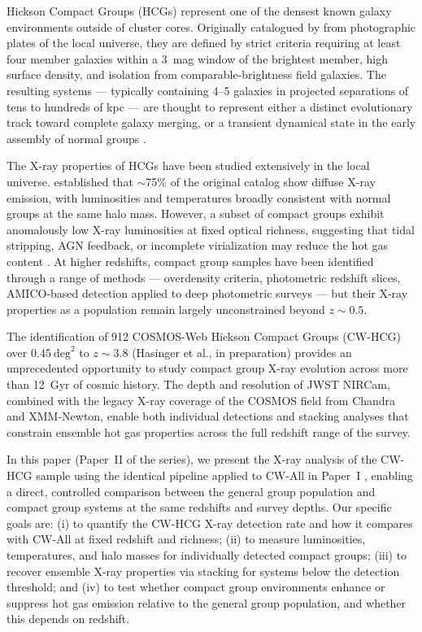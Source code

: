 \documentclass{aa}
\begin{document}
Hickson Compact Groups (HCGs) represent one of the densest known galaxy environments outside of cluster cores. Originally catalogued by \citet{Hickson1982} from photographic plates of the local universe, they are defined by strict criteria requiring at least four member galaxies within a 3~mag window of the brightest member, high surface density, and isolation from comparable-brightness field galaxies. The resulting systems --- typically containing 4--5 galaxies in projected separations of tens to hundreds of kpc --- are thought to represent either a distinct evolutionary track toward complete galaxy merging, or a transient dynamical state in the early assembly of normal groups \citep{MendesDeOliveira1994}.

The X-ray properties of HCGs have been studied extensively in the local universe. \citet{Ponman1996} established that $\sim$75\% of the original \citet{Hickson1982} catalog show diffuse X-ray emission, with luminosities and temperatures broadly consistent with normal groups at the same halo mass. However, a subset of compact groups exhibit anomalously low X-ray luminosities at fixed optical richness, suggesting that tidal stripping, AGN feedback, or incomplete virialization may reduce the hot gas content \citep{Mulchaey2000,Osmond2004}. At higher redshifts, compact group samples have been identified through a range of methods --- overdensity criteria, photometric redshift slices, AMICO-based detection applied to deep photometric surveys --- but their X-ray properties as a population remain largely unconstrained beyond $z \sim 0.5$.

The identification of 912 COSMOS-Web Hickson Compact Groups (CW-HCG) over $0.45~\mathrm{deg}^2$ to $z \sim 3.8$ (Hasinger et al., in preparation) provides an unprecedented opportunity to study compact group X-ray evolution across more than 12~Gyr of cosmic history. The depth and resolution of JWST NIRCam, combined with the legacy X-ray coverage of the COSMOS field from Chandra and XMM-Newton, enable both individual detections and stacking analyses that constrain ensemble hot gas properties across the full redshift range of the survey.

In this paper (Paper~II of the series), we present the X-ray analysis of the CW-HCG sample using the identical pipeline applied to CW-All in Paper~I \citep{Gozaliasl2026a}, enabling a direct, controlled comparison between the general group population and compact group systems at the same redshifts and survey depths. Our specific goals are: (i) to quantify the CW-HCG X-ray detection rate and how it compares with CW-All at fixed redshift and richness; (ii) to measure luminosities, temperatures, and halo masses for individually detected compact groups; (iii) to recover ensemble X-ray properties via stacking for systems below the detection threshold; and (iv) to test whether compact group environments enhance or suppress hot gas emission relative to the general group population, and whether this depends on redshift.
\end{document}
